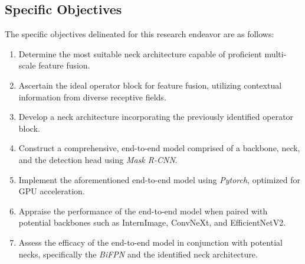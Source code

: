 \subsection{Specific Objectives} \label{10:spec-obj}
The specific objectives delineated for this research endeavor are as follows:
\begin{enumerate}
    \item Determine the most suitable neck architecture capable of proficient multi-scale feature fusion.
    \item Ascertain the ideal operator block for feature fusion, utilizing contextual information from diverse receptive fields.
    \item Develop a neck architecture incorporating the previously identified operator block.
    \item Construct a comprehensive, end-to-end model comprised of a backbone, neck, and the detection head using \textit{Mask R-CNN}.
    \item Implement the aforementioned end-to-end model using \textit{Pytorch}, optimized for GPU acceleration.
    \item Appraise the performance of the end-to-end model when paired with potential backbones such as InternImage, ConvNeXt, and EfficientNetV2.
    \item Assess the efficacy of the end-to-end model in conjunction with potential necks, specifically the \textit{BiFPN} and the identified neck architecture.
\end{enumerate}

